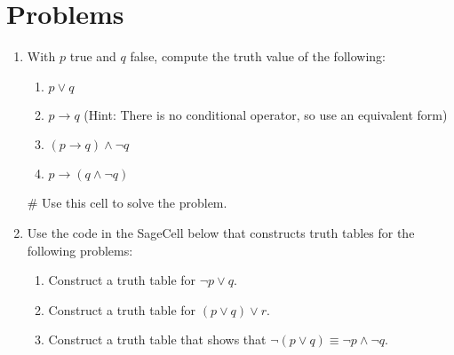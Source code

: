 \documentclass{ximera}
\begin{document}
\section{Problems}

    \begin{enumerate}
    \item With $p$ true and $q$ false, compute the truth value of the following:
    \begin{enumerate}
        \item $p\vee q$
        \item $p\to q$ (Hint: There is no conditional operator, so use an equivalent form)
        \item $(p\to q)\wedge \neg q$
        \item $p\to (q\wedge \neg q)$
    \end{enumerate}
\begin{sageCell}
# Use this cell to solve the problem.
\end{sageCell}

    \item Use the code in the SageCell below that constructs truth tables for the following problems:
        \begin{enumerate}
            \item Construct a truth table for $\neg p \vee q$.
            \item Construct a truth table for $(p \vee q) \vee r$.
            \item Construct a truth table that shows that $\neg(p \vee q) \equiv \neg p \wedge \neg q$.
        \end{enumerate}
\end{enumerate}
\end{document}
